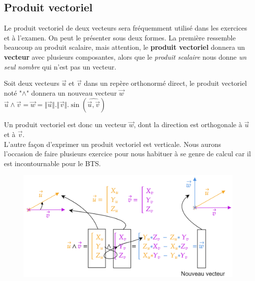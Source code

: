 \documentclass[
	11pt, %
	fleqn, %
	a4paper, %
]{LegrandOrangeBook}
\begin{document}
\subsection{Produit vectoriel}\label{Produit vectoriel}
Le produit vectoriel de deux vecteurs sera fréquemment utilisé dans les exercices et à l'examen. On peut le présenter sous deux formes. La première ressemble beaucoup au produit scalaire, mais attention, le \textbf{produit vectoriel} donnera un \textbf{vecteur} avec plusieurs composantes, alors que le \textit{produit scalaire} nous donne \textit{un seul nombre} qui n'est pas un vecteur.

\begin{definition}
    Soit deux vecteurs $\vec{u}$ et $\Vec{v}$ dans un repère orthonormé direct, le produit vectoriel noté "$\land$" donnera un nouveau vecteur $\vec{w}$ \\
    $\vec{u} \land \vec{v} = \vec{w} = \Vert \vec{u} \Vert . \Vert \vec{v} \Vert . \sin ( \widehat{\Vec{u}, \Vec{v}} )$
\end{definition}

Un produit vectoriel est donc un vecteur $\vec{w}$, dont la direction est orthogonale à $\vec{u}$ et à $\Vec{v}$. \\

L'autre façon d'exprimer un produit vectoriel est verticale. Nous aurons l'occasion de faire plusieurs exercice pour nous habituer à se genre de calcul car il est incontournable pour le BTS.

\begin{figure}[H] %
	\centering %
	\includegraphics[width=1\textwidth]{Images/vecto1.png} %
\end{figure}
\end{document}
